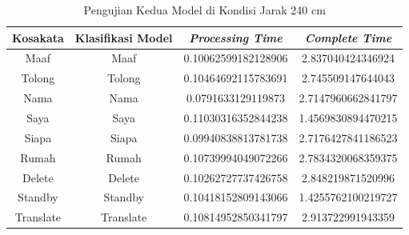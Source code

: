 \newpage
\begin{longtable}{|c|c|c|c|}
  \caption{Pengujian Kedua Model di Kondisi Jarak 240 cm}
  \label{tb:prediksitengah2}                                   \\
  \hline
  \rowcolor[HTML]{C0C0C0}
  \textbf{Kosakata} & \textbf{Klasifikasi Model} & \textbf{\emph{Processing Time}} & \textbf{\emph{Complete Time}}\\
  \hline
  Maaf              & Maaf                        & 0.10062599182128906                           & 2.837040424346924                                  \\
  Tolong            & Tolong                        & 0.10464692115783691                           & 2.745509147644043                                  \\
  Nama              & Nama                        & 0.0791633129119873                          & 2.7147960662841797                                  \\
  Saya              & Saya                        & 0.11030316352844238                           & 1.4569830894470215                                  \\
  Siapa              & Siapa                        & 0.09940838813781738                           & 2.7176427841186523                                  \\
  Rumah             & Rumah                        & 0.10739994049072266                           & 2.7834320068359375                                  \\
  Delete            & Delete                        & 0.10262727737426758                           & 2.848219871520996                                  \\
  Standby           & Standby                        & 0.10418152809143066                           & 1.4255762100219727                                  \\
  Translate         & Translate                        & 0.10814952850341797                           & 2.913722991943359                                  \\
  \hline
\end{longtable}

